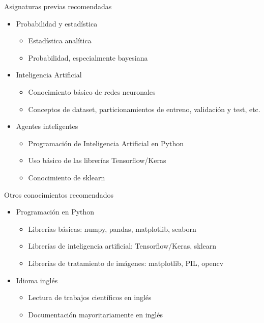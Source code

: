 \begin{frame}{Asignaturas previas recomendadas}
\begin{itemize}
    \item \alert{Probabilidad y estadística}
    \begin{itemize}
        \item Estadística analítica
        \item Probabilidad, especialmente bayesiana
    \end{itemize}
    \item \alert{Inteligencia Artificial}
    \begin{itemize}
        \item Conocimiento básico de redes neuronales
        \item Conceptos de dataset, particionamientos de entreno, validación y test, etc.
    \end{itemize}
    \item \alert{Agentes inteligentes}
    \begin{itemize}
        \item Programación de Inteligencia Artificial en Python
        \item Uso básico de las librerías Tensorflow/Keras
        \item Conocimiento de sklearn
    \end{itemize}
\end{itemize}
\end{frame}

\begin{frame}{Otros conocimientos recomendados}
\begin{itemize}
    \item \alert{Programación en Python}
    \begin{itemize}
        \item Librerías básicas: numpy, pandas, matplotlib, seaborn
        \item Librerías de inteligencia artificial: Tensorflow/Keras, sklearn
        \item Librerías de tratamiento de imágenes: matplotlib, PIL, opencv
    \end{itemize}
    \item \alert{Idioma inglés}
    \begin{itemize}
        \item Lectura de trabajos científicos en inglés
        \item Documentación mayoritariamente en inglés
    \end{itemize}
\end{itemize}
\end{frame}

